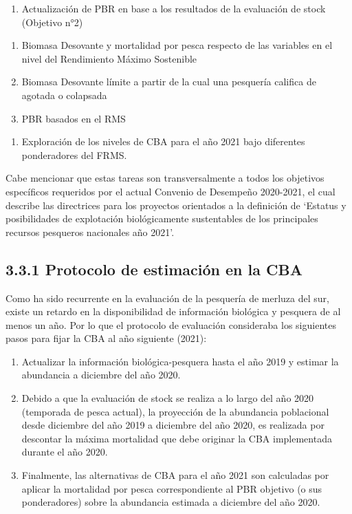 \documentclass[
  spanish,
]{article}
\providecommand{\tightlist}{%
  \setlength{\itemsep}{0pt}\setlength{\parskip}{0pt}}
\begin{document}
\begin{enumerate}
\def\labelenumi{\arabic{enumi}.}
\setcounter{enumi}{2}
\tightlist
\item
  Actualización de PBR en base a los resultados de la evaluación de
  stock (Objetivo n°2)
\end{enumerate}

\begin{enumerate}
\def\labelenumi{\roman{enumi}.}
\tightlist
\item
  Biomasa Desovante y mortalidad por pesca respecto de las variables en
  el nivel del Rendimiento Máximo Sostenible
\item
  Biomasa Desovante límite a partir de la cual una pesquería califica de
  agotada o colapsada
\item
  PBR basados en el RMS
\end{enumerate}

\begin{enumerate}
\def\labelenumi{\arabic{enumi}.}
\setcounter{enumi}{3}
\tightlist
\item
  Exploración de los niveles de CBA para el año 2021 bajo diferentes
  ponderadores del FRMS.
\end{enumerate}

Cabe mencionar que estas tareas son transversalmente a todos los
objetivos específicos requeridos por el actual Convenio de Desempeño
2020-2021, el cual describe las directrices para los proyectos
orientados a la definición de `Estatus y posibilidades de explotación
biológicamente sustentables de los principales recursos pesqueros
nacionales año 2021'.

\hypertarget{protocolo-de-estimaciuxf3n-en-la-cba}{%
\subsection{3.3.1 Protocolo de estimación en la
CBA}\label{protocolo-de-estimaciuxf3n-en-la-cba}}

Como ha sido recurrente en la evaluación de la pesquería de merluza del
sur, existe un retardo en la disponibilidad de información biológica y
pesquera de al menos un año. Por lo que el protocolo de evaluación
consideraba los siguientes pasos para fijar la CBA al año siguiente
(2021):

\begin{enumerate}
\def\labelenumi{\arabic{enumi}.}
\tightlist
\item
  Actualizar la información biológica-pesquera hasta el año 2019 y
  estimar la abundancia a diciembre del año 2020.
\item
  Debido a que la evaluación de stock se realiza a lo largo del año 2020
  (temporada de pesca actual), la proyección de la abundancia
  poblacional desde diciembre del año 2019 a diciembre del año 2020, es
  realizada por descontar la máxima mortalidad que debe originar la CBA
  implementada durante el año 2020.
\item
  Finalmente, las alternativas de CBA para el año 2021 son calculadas
  por aplicar la mortalidad por pesca correspondiente al PBR objetivo (o
  sus ponderadores) sobre la abundancia estimada a diciembre del año
  2020.
\end{enumerate}
\end{document}
